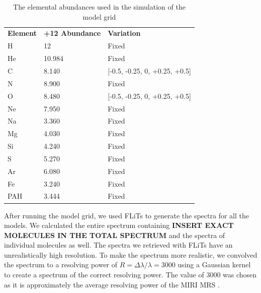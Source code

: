 \documentclass[oneside, single, authoryear, semicolon]{lion-msc}
\newcommand{\4}{$_4$}
\newcommand{\3}{$_3$}
\newcommand{\2}{$_2$}
\begin{document}
\begin{table}[!ht]
\centering
\begin{tabular}{@{}lll@{}}
                                  &                             &                            \\ \hline\midrule
\textbf{Element} & \textbf{+12 Abundance} & \textbf{Variation}            \\ \midrule
H                & 12                     & Fixed                         \\
He               & 10.984                 & Fixed                         \\
C                & 8.140                  & {[}-0.5, -0.25, 0, +0.25, +0.5{]} \\
N                & 8.900                  & Fixed                         \\
O                & 8.480                  & {[}-0.5, -0.25, 0, +0.25, +0.5{]} \\
Ne               & 7.950                  & Fixed                         \\
Na               & 3.360                  & Fixed                         \\
Mg               & 4.030                  & Fixed                         \\
Si               & 4.240                  & Fixed                         \\
S                & 5.270                  & Fixed                         \\
Ar               & 6.080                  & Fixed                         \\
Fe               & 3.240                  & Fixed                         \\
PAH              & 3.444                  & Fixed                         \\ \bottomrule
\end{tabular}
\caption{The elemental abundances used in the simulation of the model grid}
\label{tab: abundances}
\end{table}



After running the model grid, we used FLiTs to generate the spectra for all the models. We calculated the entire spectrum containing  \textbf{INSERT EXACT MOLECULES IN THE TOTAL SPECTRUM} and the spectra of individual molecules as well. The spectra we retrieved with FLiTs have an unrealistically high resolution. To make the spectrum more realistic, we convolved the spectrum to a resolving power of $R = \Delta\lambda/\lambda = 3000$ using a Gaussian kernel to create a spectrum of the correct resolving power. The value of 3000 was chosen as it is approximately the average resolving power of the MIRI MRS \citep{SOURCE}. 
\end{document}
